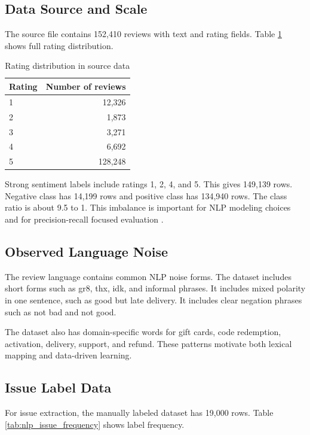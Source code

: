 \documentclass[12pt,a4paper]{article}
\begin{document}
\subsection{Data Source and Scale}
The source file contains 152,410 reviews with text and rating fields. Table \ref{tab:nlp_rating_distribution} shows full rating distribution.

\begin{table}[H]
\centering
\caption{Rating distribution in source data}
\label{tab:nlp_rating_distribution}
\begin{tabular}{lr}
\toprule
Rating & Number of reviews \\
\midrule
1 & 12,326 \\
2 & 1,873 \\
3 & 3,271 \\
4 & 6,692 \\
5 & 128,248 \\
\bottomrule
\end{tabular}
\end{table}

Strong sentiment labels include ratings 1, 2, 4, and 5. This gives 149,139 rows. Negative class has 14,199 rows and positive class has 134,940 rows. The class ratio is about 9.5 to 1. This imbalance is important for NLP modeling choices and for precision-recall focused evaluation \cite{saito2015}.

\subsection{Observed Language Noise}
The review language contains common NLP noise forms. The dataset includes short forms such as gr8, thx, idk, and informal phrases. It includes mixed polarity in one sentence, such as good but late delivery. It includes clear negation phrases such as not bad and not good.

The dataset also has domain-specific words for gift cards, code redemption, activation, delivery, support, and refund. These patterns motivate both lexical mapping and data-driven learning.

\subsection{Issue Label Data}
For issue extraction, the manually labeled dataset has 19,000 rows. Table \ref{tab:nlp_issue_frequency} shows label frequency.
\end{document}
